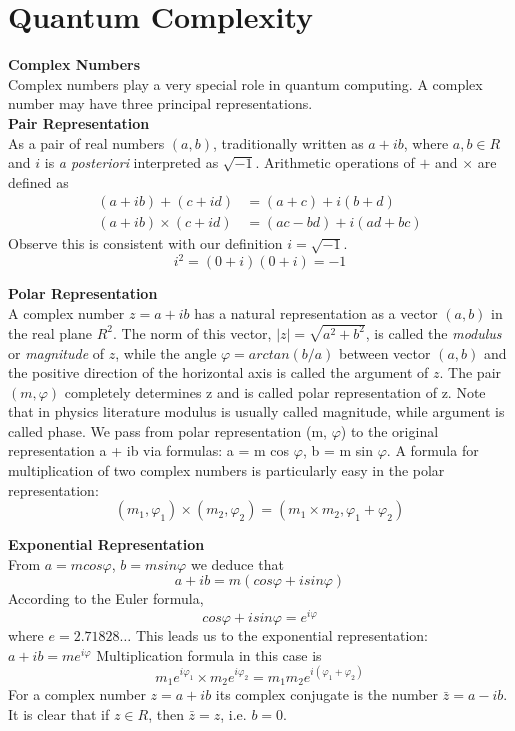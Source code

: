 \section{Quantum Complexity}
\textbf{Complex Numbers}\\
Complex numbers play a very special role in quantum computing.
A complex number may have three principal representations.\\

\textbf{Pair Representation}\\
As a pair of real numbers $(a, b)$, traditionally written as $a + ib$,
where $a, b \in R$ and $i$ is \textit{a posteriori} interpreted as $\sqrt{-1}$.
Arithmetic operations of $+$ and $\times$ are defined as
\begin{align*}
    (a+ib) +      (c+id) &= (a+c)   + i(b+d)  \\
    (a+ib) \times (c+id) &= (ac−bd) + i(ad+bc)
\end{align*}
Observe this is consistent with our definition $i=\sqrt{-1}$.
$$i^2 = (0 + i)(0 + i) = −1$$

\textbf{Polar Representation}\\
A complex number $z = a + ib$ has a natural representation
as a vector $(a,b)$ in the real plane $R^2$.
The norm of this vector, $|z| = \sqrt{a^2 +b^2}$,
is called the \textit{modulus} or \textit{magnitude} of $z$,
while the angle $\varphi = arctan(b/a)$ between vector $(a, b)$
and the positive direction of the horizontal axis is called the argument of $z$.
The pair $(m,\varphi)$ completely determines z and is called polar representation of z.
Note that in physics literature modulus is usually called magnitude, while argument is called phase.
We pass from polar representation (m, $\varphi$) to the original representation a + ib via formulas:
a = m cos $\varphi$, b = m sin $\varphi$.
A formula for multiplication of two complex numbers is particularly
easy in the polar representation:
$$(m_1, \varphi_1) \times (m_2, \varphi_2) = (m_1 \times m_2, \varphi_1 + \varphi_2)$$

\textbf{Exponential Representation}\\
From $a = m cos \varphi$, $b = m sin \varphi$ we deduce that
$$a + ib = m(cos\varphi + isin\varphi)$$
According to the Euler formula,
$$cos\varphi + isin\varphi = e^{i\varphi}$$
where $e = 2.71828\dots$
This leads us to the exponential representation:
$a + ib = me^{i\varphi}$
Multiplication formula in this case is
$$m_1e^{i\varphi_1} \times m_2e^{i\varphi_2} = m_1m_2e^{i(\varphi_1+\varphi_2)}$$
For a complex number $z = a + ib$ its complex conjugate is the number $\bar{z} = a − ib$.
It is clear that if $z \in R$, then $\bar{z} = z$, i.e. $b = 0$.

